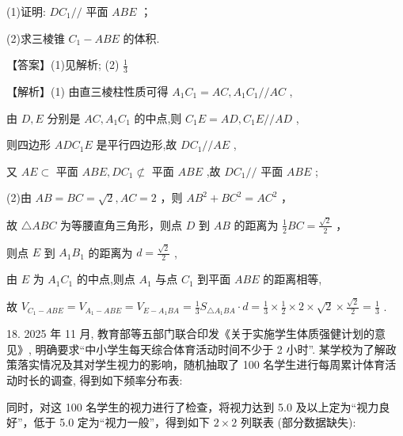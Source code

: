 \documentclass[10pt]{article}
\begin{document}
(1)证明: \(D{C}_{1}//\) 平面 \({ABE}\) ；

(2)求三棱锥 \({C}_{1} - {ABE}\) 的体积.

【答案】(1)见解析; (2) \(\frac{1}{3}\)

【解析】(1) 由直三棱柱性质可得 \({A}_{1}{C}_{1} = {AC},{A}_{1}{C}_{1}//{AC}\) ,

由 \(D,E\) 分别是 \({AC},{A}_{1}{C}_{1}\) 的中点,则 \({C}_{1}E = {AD},{C}_{1}E//{AD}\) ,

则四边形 \({AD}{C}_{1}E\) 是平行四边形,故 \(D{C}_{1}//{AE}\) ,

又 \({AE} \subset\) 平面 \({ABE},D{C}_{1} \not\subset\) 平面 \({ABE}\) ,故 \(D{C}_{1}//\) 平面 \({ABE}\) ;

(2)由 \({AB} = {BC} = \sqrt{2},{AC} = 2\) ，则 \({A{B}^{2}} + {B{C}^{2}} = {A{C}^{2}}\) ，

故 \(\bigtriangleup  {ABC}\) 为等腰直角三角形，则点 \(D\) 到 \({AB}\) 的距离为 \(\frac{1}{2}{BC} = \frac{\sqrt{2}}{2}\) ，

则点 \(E\) 到 \({A}_{1}{B}_{1}\) 的距离为 \(d = \frac{\sqrt{2}}{2}\) ,

由 \(E\) 为 \({A}_{1}{C}_{1}\) 的中点,则点 \({A}_{1}\) 与点 \({C}_{1}\) 到平面 \({ABE}\) 的距离相等,

故 \({V}_{{C}_{1} - {ABE}} = {V}_{{A}_{1} - {ABE}} = {V}_{E - {A}_{1}{BA}} = \frac{1}{3}{S}_{\bigtriangleup {A}_{1}{BA}} \cdot  d = \frac{1}{3} \times  \frac{1}{2} \times  2 \times  \sqrt{2} \times  \frac{\sqrt{2}}{2} = \frac{1}{3}\) .

18. 2025 年 11 月, 教育部等五部门联合印发《关于实施学生体质强健计划的意见》, 明确要求“中小学生每天综合体育活动时间不少于 2 小时”. 某学校为了解政策落实情况及其对学生视力的影响，随机抽取了 100 名学生进行每周累计体育活动时长的调查, 得到如下频率分布表:

\begin{center}
\end{center}

同时，对这 100 名学生的视力进行了检查，将视力达到 5.0 及以上定为“视力良好”，低于 5.0 定为“视力一般”，得到如下 \(2 \times  2\) 列联表 (部分数据缺失):
\end{document}
